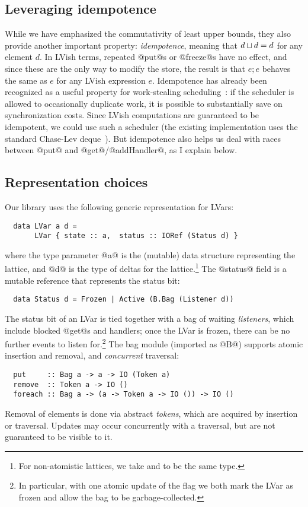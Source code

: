 \subsection{Leveraging idempotence}\label{subsection:lvish-leveraging-idempotence}

While we have emphasized the commutativity of least upper bounds, they
also provide another important property: \emph{idempotence}, meaning
that $d \sqcup d = d$ for any element $d$.  In LVish terms,
repeated @put@s or @freeze@s have no effect, and since these are the
only way to modify the store, the result is that $e; e$ behaves the
same as $e$ for any LVish expression $e$.  Idempotence has already
been recognized as a useful property for work-stealing
scheduling~\cite{idempotent}: if the scheduler is allowed to
occasionally duplicate work, it is possible to substantially save on
synchronization costs.  Since LVish computations are guaranteed to be
idempotent, we could use such a scheduler (the existing implementation
uses the standard Chase-Lev deque~\cite{ChaseLev}).  But idempotence
also helps us deal with races between @put@ and @get@/@addHandler@, as
I explain below.

\subsection{Representation choices}
Our library uses the following generic representation for LVars:
\begin{lstlisting}
  data LVar a d = 
       LVar { state :: a,  status :: IORef (Status d) }
\end{lstlisting}
where the type parameter @a@ is the (mutable) data structure representing the
lattice, and @d@ is the type of deltas for the lattice.\footnote{For
  non-atomistic lattices, we take  and  to be the same type.}
The @status@ field is a mutable reference that represents the status bit:
\begin{lstlisting}
  data Status d = Frozen | Active (B.Bag (Listener d))
\end{lstlisting}
The status bit of an LVar is tied together with a bag of waiting
\emph{listeners}, which include blocked @get@s and handlers; once the LVar is
frozen, there can be no further events to listen for.\footnote{In particular,
  with one atomic update of the flag we both mark the LVar as frozen and allow
  the bag to be garbage-collected.}  The bag module (imported as @B@) supports
atomic insertion and removal, and \emph{concurrent} traversal:
\begin{lstlisting}
  put     :: Bag a -> a -> IO (Token a)
  remove  :: Token a -> IO ()
  foreach :: Bag a -> (a -> Token a -> IO ()) -> IO ()
\end{lstlisting}
Removal of elements is done via abstract \emph{tokens}, which are acquired by
insertion or traversal.  Updates may occur concurrently with a traversal, but
are not guaranteed to be visible to it.

